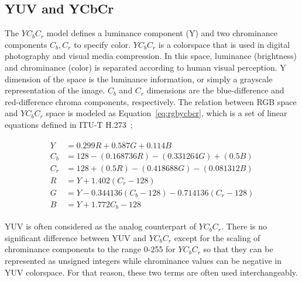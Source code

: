 \subsection*{YUV and YCbCr}
The \(YC_{b}C_{r}\) model defines a luminance component (Y) and two chrominance components \(C_{b}, C_{r}\) to specify color. \(YC_{b}C_{r}\) is a colorspace that is used in digital photography and visual media compression. In this space, luminance (brightness) and chrominance (color) is separated according to human visual perception. Y dimension of the space is the luminance information, or simply a grayscale representation of the image. \(C_b\) and \(C_r\) dimensions are the blue-difference and red-difference chroma components, respectively. The relation between RGB space and \(YC_{b}C_{r}\) space is modeled as Equation~\ref*{eq:rgbycbcr}, which is a set of linear equations defined in ITU-T H.273~\cite{hamilton2004jpeg};

\begin{align}
    \label{eq:rgbycbcr}
    \begin{split}
        Y   & = 0.299 R+0.587 G+0.114 B                   \\
        C_b & = 128-(0.168736 R)-(0.331264 G)+(0.5 B)     \\
        C_r & = 128+(0.5 R)-(0.418688 G)-(0.081312 B)     \\
        R & = Y+1.402(C_{r}-128)                        \\
        G & = Y-0.344136(C_{b}-128)-0.714136(C_{r}-128) \\
        B & = Y+1.772C_b-128
    \end{split}
\end{align}

YUV is often considered as the analog counterpart of \(YC_{b}C_{r}\). There is no significant difference between YUV and \(YC_{b}C_{r}\) except for the scaling of chrominance components to the range 0-255 for \(YC_{b}C_{r}\) so that they can be represented as unsigned integers while chrominance values can be negative in YUV colorspace. For that reason, these two terms are often used interchangeably.

